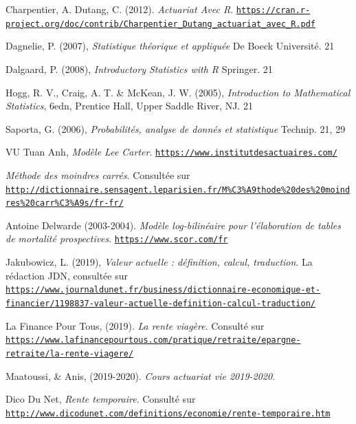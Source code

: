 \documentclass[french]{report}
\begin{document}
\begin{thebibliography}{9}



Charpentier, A. Dutang, C. (2012). \textit{Actuariat Avec R}. \texttt{\url{https://cran.r-project.org/doc/contrib/Charpentier_Dutang_actuariat_avec_R.pdf}}
\vskip 0.1in

Dagnelie, P. (2007), \textit{Statistique théorique et appliquée}
De Boeck Université. 21
\vskip 0.1in

Dalgaard, P. (2008), \textit{Introductory Statistics with R}
Springer. 21
\vskip 0.1in

Hogg, R. V., Craig, A. T. \& McKean, J. W. (2005),
\textit{Introduction to Mathematical Statistics}, 
6edn, Prentice Hall, Upper Saddle River, NJ. 21
\vskip 0.1in


Saporta, G. (2006), 
\textit{Probabilités, analyse de donnés et statistique}
Technip. 21, 29
\vskip 0.1in


VU Tuan Anh, \textit{Modèle Lee Carter}. \texttt{\url{https://www.institutdesactuaires.com/}}
\vskip 0.1in


\textit{Méthode des moindres carrés}. Consultée sur \texttt{\url{http://dictionnaire.sensagent.leparisien.fr/M\%C3\%A9thode\%20des\%20moindres\%20carr\%C3\%A9s/fr-fr/}}
\vskip 0.1in

Antoine Delwarde (2003-2004). \textit{Modèle log-bilinéaire pour
l'élaboration de tables de
mortalité prospectives}. \texttt{\url{https://www.scor.com/fr}}
\vskip 0.1in


Jakubowicz, L. (2019), \textit{Valeur actuelle : définition, calcul, traduction}. La rédaction JDN, consultée sur \texttt{\url{https://www.journaldunet.fr/business/dictionnaire-economique-et-financier/1198837-valeur-actuelle-definition-calcul-traduction/}}


\vskip 0.1in
La Finance Pour Tous, (2019). \textit{La rente viagère}. Consulté sur \texttt{\url{https://www.lafinancepourtous.com/pratique/retraite/epargne-retraite/la-rente-viagere/}}
\vskip 0.1in

 Maatoussi, & Anis, (2019-2020). \textit{Cours actuariat vie 2019-2020}. 
\vskip 0.1in

Dico Du Net, \textit{Rente temporaire}. Consulté sur \texttt{\url{http://www.dicodunet.com/definitions/economie/rente-temporaire.htm}}
\vskip 0.1in


\end{thebibliography}
\end{document}
